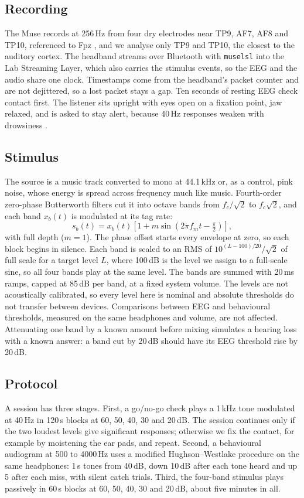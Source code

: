 \documentclass[conference]{IEEEtran}
\begin{document}
\subsection{Recording}
The Muse records at 256\,Hz from four dry electrodes near TP9, AF7, AF8 and TP10, referenced to Fpz \cite{krigolson2017}, and we analyse only TP9 and TP10, the closest to the auditory cortex. The headband streams over Bluetooth with \texttt{muselsl} into the Lab Streaming Layer, which also carries the stimulus events, so the EEG and the audio share one clock. Timestamps come from the headband's packet counter and are not dejittered, so a lost packet stays a gap. Ten seconds of resting EEG check contact first. The listener sits upright with eyes open on a fixation point, jaw relaxed, and is asked to stay alert, because 40\,Hz responses weaken with drowsiness \cite{picton2003assr}.

\subsection{Stimulus}
The source is a music track converted to mono at 44.1\,kHz or, as a control, pink noise, whose energy is spread across frequency much like music. Fourth-order zero-phase Butterworth filters cut it into octave bands from $f_c/\sqrt{2}$ to $f_c\sqrt{2}$, and each band $x_b(t)$ is modulated at its tag rate:
\begin{equation}
  s_b(t) = x_b(t)\left[1 + m \sin\!\left(2\pi f_m t - \tfrac{\pi}{2}\right)\right],
\end{equation}
with full depth ($m = 1$). The phase offset starts every envelope at zero, so each block begins in silence. Each band is scaled to an RMS of $10^{(L - 100)/20}/\sqrt{2}$ of full scale for a target level $L$, where 100\,dB is the level we assign to a full-scale sine, so all four bands play at the same level. The bands are summed with 20\,ms ramps, capped at 85\,dB per band, at a fixed system volume. The levels are not acoustically calibrated, so every level here is nominal and absolute thresholds do not transfer between devices. Comparisons between EEG and behavioural thresholds, measured on the same headphones and volume, are not affected. Attenuating one band by a known amount before mixing simulates a hearing loss with a known answer: a band cut by 20\,dB should have its EEG threshold rise by 20\,dB.

\subsection{Protocol}
A session has three stages. First, a go/no-go check plays a 1\,kHz tone modulated at 40\,Hz in 120\,s blocks at 60, 50, 40, 30 and 20\,dB. The session continues only if the two loudest levels give significant responses; otherwise we fix the contact, for example by moistening the ear pads, and repeat. Second, a behavioural audiogram at 500 to 4000\,Hz uses a modified Hughson--Westlake procedure \cite{carhart1959} on the same headphones: 1\,s tones from 40\,dB, down 10\,dB after each tone heard and up 5 after each miss, with silent catch trials. Third, the four-band stimulus plays passively in 60\,s blocks at 60, 50, 40, 30 and 20\,dB, about five minutes in all.
\end{document}
